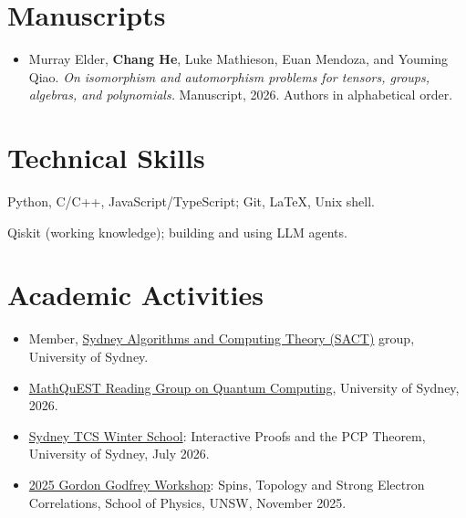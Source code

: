 \documentclass[11pt,a4paper]{article}
\newcommand{\interest}[2]{%
  \item[\textit{#1}] #2}
\begin{document}
\section{Manuscripts}

\begin{itemize}
  \item Murray Elder, \textbf{Chang He}, Luke Mathieson, Euan Mendoza, and Youming Qiao.
        \textit{On isomorphism and automorphism problems for tensors, groups, algebras, and polynomials.}
        Manuscript, 2026. Authors in alphabetical order.
\end{itemize}

\section{Technical Skills}

\begin{description}[leftmargin=0pt, labelsep=0.5em, topsep=0pt, itemsep=3pt,
                    parsep=0pt, font=\normalfont]
  \interest{Programming.}
    {Python, C/C++, JavaScript/TypeScript; Git, LaTeX, Unix shell.}
  \interest{Quantum and AI.}
    {Qiskit (working knowledge); building and using LLM agents.}
\end{description}

\section{Academic Activities}

\begin{itemize}
  \item Member, \href{https://usyd-sact.github.io}{Sydney Algorithms and Computing Theory (SACT)} group, University of Sydney.
  \item \href{https://www.maths.usyd.edu.au/s/scnitm/pieter-QuantumComputingReadingGr}{MathQuEST Reading Group on Quantum Computing}, University of Sydney, 2026.
  \item \href{https://sites.google.com/view/sydney-tcs-winter-school-2026/home}{Sydney TCS Winter School}: Interactive Proofs and the PCP Theorem, University of Sydney, July 2026.
  \item \href{https://newt.phys.unsw.edu.au/Godfrey/2025/Godfrey}{2025 Gordon Godfrey Workshop}: Spins, Topology and Strong Electron Correlations, School of Physics, UNSW, November 2025.
\end{itemize}
\end{document}
